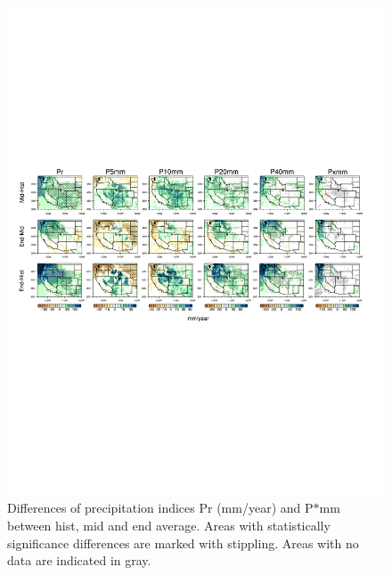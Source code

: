\documentclass{ametsoc}
\begin{document}
\begin{figure}
\begin{center}
\includegraphics[width=8in, trim={0.6cm 9.5cm 1.0cm 9.0cm},clip]{wd_index_all_years_part2.pdf}
\caption{Differences of precipitation indices Pr (mm/year) and P$\ast$mm between \textsf{hist}, \textsf{mid} and \textsf{end} average.  Areas with statistically significance differences are marked with stippling.  Areas with no data are indicated in gray.}
\label{fig:difIndex2}
\end{center}
\end{figure}
\end{document}
